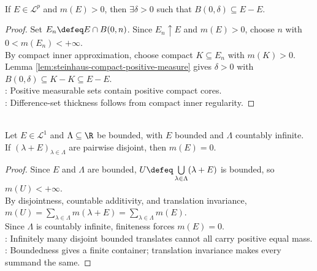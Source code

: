 \begin{theorem} \label{thm:steinhaus-positive-measure-difference-neighborhood} \\
If $E\in\mathcal{L}^p$ and $m(E)>0$, then $\exists\delta>0$ such that $B(0,\delta)\subseteq E-E$.
\begin{proof}
Set $E_n\defeq E\cap B(0,n)$. Since $E_n\uparrow E$ and $m(E)>0$, choose $n$ with $0<m(E_n)<+\infty$.\\
By compact inner approximation, choose compact $K\subseteq E_n$ with $m(K)>0$.\\
Lemma \ref{lem:steinhaus-compact-positive-measure} gives $\delta>0$ with $B(0,\delta)\subseteq K-K\subseteq E-E$.\\
: Positive measurable sets contain positive compact cores.\\
: Difference-set thickness follows from compact inner regularity.
\end{proof}
\end{theorem}

\begin{lemma} \label{lem:bounded-disjoint-translates-force-null} \\
Let $E\in\mathcal{L}^1$ and $\Lambda\subseteq\R$ be bounded, with $E$ bounded and $\Lambda$ countably infinite.\\
If $(\lambda+E)_{\lambda\in\Lambda}$ are pairwise disjoint, then $m(E)=0$.
\begin{proof} Since $E$ and $\Lambda$ are bounded, $U\defeq\bigcup\limits_{\lambda\in\Lambda}(\lambda+E)$ is bounded, so $m(U)<+\infty$.\\
By disjointness, countable additivity, and translation invariance, $m(U)=\sum\limits_{\lambda\in\Lambda}m(\lambda+E)=\sum\limits_{\lambda\in\Lambda}m(E)$.\\
Since $\Lambda$ is countably infinite, finiteness forces $m(E)=0$.\\
: Infinitely many disjoint bounded translates cannot all carry positive equal mass.\\
: Boundedness gives a finite container; translation invariance makes every summand the same.
\end{proof}
\end{lemma}

